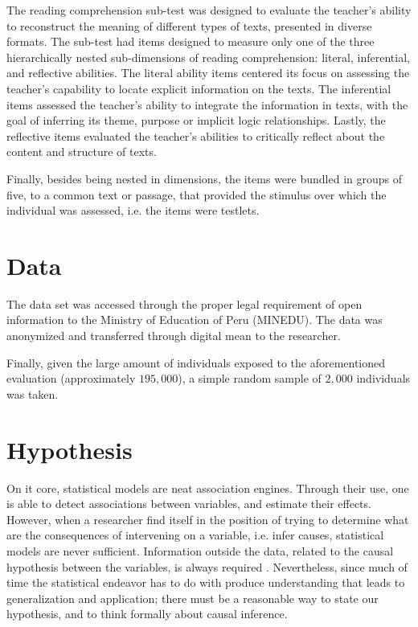 The reading comprehension sub-test was designed to evaluate the teacher's ability to reconstruct the meaning of different types of texts, presented in diverse formats. The sub-test had items designed to measure only one of the three hierarchically nested sub-dimensions of reading comprehension: literal, inferential, and reflective abilities. The literal ability items centered its focus on assessing the teacher's capability to locate explicit information on the texts. The inferential items assessed the teacher's ability to integrate the information in texts, with the goal of inferring its theme, purpose or implicit logic relationships. Lastly, the reflective items evaluated the teacher's abilities to critically reflect about the content and structure of texts.

Finally, besides being nested in dimensions, the items were bundled in groups of five, to a common text or passage, that provided the stimulus over which the individual was assessed, i.e. the items were testlets. 



\section{Data}

The data set was accessed through the proper legal requirement of open information to the Ministry of Education of Peru (MINEDU). The data was anonymized and transferred through digital mean to the researcher.

Finally, given the large amount of individuals exposed to the aforementioned evaluation (approximately $195,000$), a simple random sample of $2,000$ individuals was taken. 


\section{Hypothesis}

On it core, statistical models are neat association engines. Through their use, one is able to detect associations between variables, and estimate their effects. However, when a researcher find itself in the position of trying to determine what are the consequences of intervening on a variable, i.e. infer causes, statistical models are never sufficient. Information outside the data, related to the causal hypothesis between the variables, is always required \cite{McElreath_2020}. Nevertheless, since much of time the statistical endeavor has to do with produce understanding that leads to generalization and application; there must be a reasonable way to state our hypothesis, and to think formally about causal inference.

